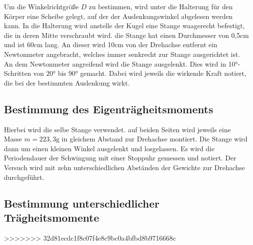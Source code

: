Um die Winkelrichtgröße $D$ zu bestimmen, wird unter die Halterung für den Körper eine Scheibe gelegt, auf der der Auslenkungswinkel 
abgelesen werden kann. In die Halterung wird anstelle der Kugel eine Stange waagerecht befestigt, die in deren Mitte verschraubt wird.
die Stange hat einen Durchmesser von 0,5$\si{\centi\meter}$ und ist 60$\si{\centi\meter}$ lang. An dieser wird 10$\si{\centi\meter}$
von der Drehachse entfernt ein Newtonmeter angebracht, welches immer senkrecht zur Stange ausgerichtet ist. An dem Newtonmeter 
angreifend wird die Stange ausgelenkt. Dies wird in 10$\si{\degree}$-Schritten von 20$\si{\degree}$ bis 90$\si{\degree}$ gemacht.
Dabei wird jeweils die wirkende Kraft notiert, die bei der bestimmten Auslenkung wirkt. 

\subsection{Bestimmung des Eigenträgheitsmoments}

Hierbei wird die selbe Stange verwendet. auf beiden Seiten wird jeweils eine Masse $m=223,3\si{\gram}$ in gleichem Abstand zur 
Drehachse montiert. Die Stange wird dann um einen kleinen Winkel ausgelenkt und losgelassen. Es wird die Periodendauer der Schwingung
mit einer Stoppuhr gemessen und notiert. Der Versuch wird mit zehn unterschiedlichen Abständen der Gewichte zur Drehachse durchgeführt.

\subsection{Bestimmung unterschiedlicher Trägheitsmomente}


>>>>>>> 32d81ecdc1f8c07f4e8c9bc0a4bfbd8b9716668c


